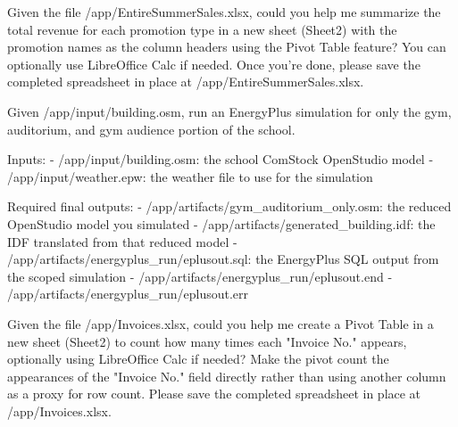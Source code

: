 \begin{instructionbox}
Given the file \textasciigrave{}/app/EntireSummerSales.xlsx\textasciigrave{}, could you help me summarize the total revenue for each promotion type in a new sheet (Sheet2) with the promotion names as the column headers using the Pivot Table feature? You can optionally use LibreOffice Calc if needed. Once you're done, please save the completed spreadsheet in place at \textasciigrave{}/app/EntireSummerSales.xlsx\textasciigrave{}.
\end{instructionbox}

\begin{instructionbox}
Given \textasciigrave{}/app/input/building.osm\textasciigrave{}, run an EnergyPlus simulation for only the gym, auditorium, and gym audience portion of the school.

Inputs:
- \textasciigrave{}/app/input/building.osm\textasciigrave{}: the school ComStock OpenStudio model
- \textasciigrave{}/app/input/weather.epw\textasciigrave{}: the weather file to use for the simulation

Required final outputs:
- \textasciigrave{}/app/artifacts/gym\_auditorium\_only.osm\textasciigrave{}: the reduced OpenStudio model you simulated
- \textasciigrave{}/app/artifacts/generated\_building.idf\textasciigrave{}: the IDF translated from that reduced model
- \textasciigrave{}/app/artifacts/energyplus\_run/eplusout.sql\textasciigrave{}: the EnergyPlus SQL output from the scoped simulation
- \textasciigrave{}/app/artifacts/energyplus\_run/eplusout.end\textasciigrave{}
- \textasciigrave{}/app/artifacts/energyplus\_run/eplusout.err\textasciigrave{}
\end{instructionbox}

\begin{instructionbox}
Given the file \textasciigrave{}/app/Invoices.xlsx\textasciigrave{}, could you help me create a Pivot Table in a new sheet (Sheet2) to count how many times each "Invoice No." appears, optionally using LibreOffice Calc if needed? Make the pivot count the appearances of the "Invoice No." field directly rather than using another column as a proxy for row count. Please save the completed spreadsheet in place at \textasciigrave{}/app/Invoices.xlsx\textasciigrave{}.
\end{instructionbox}

